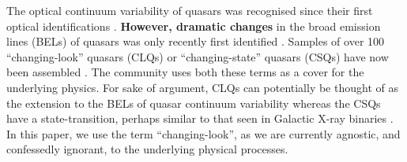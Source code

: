 \documentclass[fleqn,usenatbib]{mnras}
\begin{document}
The optical continuum variability of quasars was recognised since
their first optical identifications \citep{MatthewsSandage1963}. {\bf
However, dramatic changes} in the broad emission lines (BELs) of
quasars was only recently first identified \citep{LaMassa2015}.
Samples of over 100 ``changing-look'' quasars (CLQs) or
``changing-state'' quasars (CSQs) have now been assembled
\citep[e.g.,][]{MacLeod2019, Graham2020}. The community uses both
these terms as a cover for the underlying physics. For sake of
argument, CLQs can potentially be thought of as the extension to the
BELs of quasar continuum variability \citep[e.g., ][]{MacLeod2012}
whereas the CSQs have a state-transition, perhaps similar to that seen
in Galactic X-ray binaries \citep[][]{NodaDone2018, Ruan2019a}. In
this paper, we use the term ``changing-look'', as we are currently
agnostic, and confessedly ignorant, to the underlying physical
processes.
\end{document}
